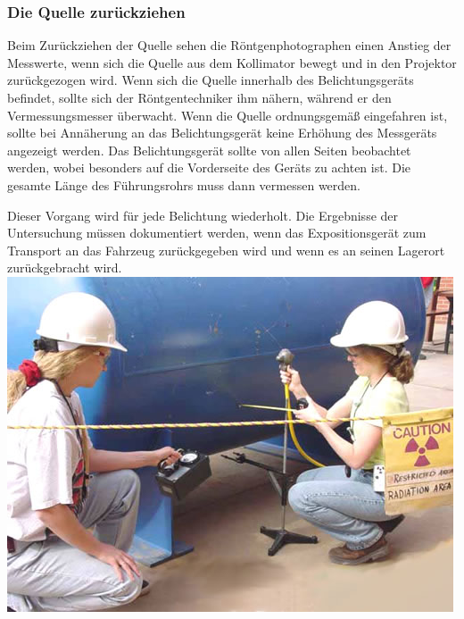 {\subsubsection{Die Quelle zurückziehen}
Beim Zurückziehen der Quelle sehen die Röntgenphotographen einen Anstieg der Messwerte, wenn sich die Quelle aus dem Kollimator bewegt und in den Projektor zurückgezogen wird. Wenn sich die Quelle innerhalb des Belichtungsgeräts befindet, sollte sich der Röntgentechniker ihm nähern, während er den Vermessungsmesser überwacht. Wenn die Quelle ordnungsgemäß eingefahren ist, sollte bei Annäherung an das Belichtungsgerät keine Erhöhung des Messgeräts angezeigt werden. Das Belichtungsgerät sollte von allen Seiten beobachtet werden, wobei besonders auf die Vorderseite des Geräts zu achten ist. Die gesamte Länge des Führungsrohrs muss dann vermessen werden.

Dieser Vorgang wird für jede Belichtung wiederholt. Die Ergebnisse der Untersuchung müssen dokumentiert werden, wenn das Expositionsgerät zum Transport an das Fahrzeug zurückgegeben wird und wenn es an seinen Lagerort zurückgebracht wird.\\
\includegraphics[scale=0.7]{img/isotope-radiography-pressure-vessel.jpg}\\
}
